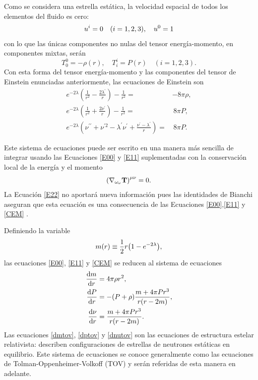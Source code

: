 Como se considera una estrella estática, la velocidad espacial de todos los elementos del fluido es cero:
\begin{equation}
    u^{i}=0 \quad (i=1,2,3)\qc u ^ { 0 } = 1
\end{equation}
con lo que las únicas componentes no nulas del tensor energía-momento, en componentes mixtas, serán
\begin{equation}
T _ { 0 } ^ { 0 } = -\rho(r) , \quad T _ { i } ^ { i } =  P(r) \quad ( i=1,2,3 ).  
\end{equation}
Con esta forma del tensor energía-momento y las componentes del tensor de Einstein enunciadas anteriormente, las ecuaciones de Einstein son
\begin{align}
     e ^ { - 2 \lambda } \left( \frac { 1 } { r ^ { 2 } } - \frac { 2 \lambda ^ { \prime } } { r } \right) - \frac { 1 } { r ^ { 2 } } =&  -8\pi\rho, \label{E00} \\
    e ^ { - 2 \lambda } \left( \frac { 1 } { r ^ { 2 } } + \frac { 2 \nu ^ { \prime } } { r } \right) - \frac { 1 } { r ^ { 2 } } =& \, 8\pi P, \label{E11}\\
    e ^ { - 2 \lambda } \left( \nu ^ { \prime \prime } + \nu ^ { \prime 2 } - \lambda ^ { \prime } \nu ^ { \prime } + \frac { \nu ^ { \prime } - \lambda ^ { \prime } } { r } \right) =& \, 8\pi P. \label{E22}
\end{align}

Este sistema de ecuaciones puede ser escrito en una manera más sencilla de integrar usando las Ecuaciones \eqref{E00} y \eqref{E11} suplementadas con la conservación local de la energía y el momento
\begin{equation}
    \qty(\nabla_{\omega_\nu}\mathbf{T})^{\mu \nu} = 0 \label{CEM}.
\end{equation}
La Ecuación \ref{E22} no aportará nueva información pues las identidades de Bianchi aseguran que esta ecuación es una consecuencia de las Ecuaciones \eqref{E00},\eqref{E11} y \eqref{CEM} \cite{Schutz2009}.

Definiendo la variable 
\begin{equation}
     m(r) \equiv \frac{1}{2}r\qty(1-e^{-2\lambda}), \label{misnermass}
\end{equation}
las ecuaciones \eqref{E00}, \eqref{E11} y \eqref{CEM} se reducen al sistema de ecuaciones 
\begin{subequations}
\begin{align}
    \dv{m}{r} &= 4\pi \rho r^2, \label{dmtov} \\
     \dv{P}{r} &= -(P+\rho)\frac{m+4\pi P  r^3}{r\qty(r-2m)},\label{dptov} \\
    \dv{\nu}{r} &= \frac{m+4\pi P   r^3}{r\qty(r-2m)}.\label{dnutov}
\end{align}
\end{subequations}
Las ecuaciones \eqref{dmtov}, \eqref{dptov} y \eqref{dnutov} son las ecuaciones de estructura estelar relativista: describen configuraciones de estrellas de neutrones estáticas en equilibrio. Este sistema de ecuaciones se conoce generalmente como las ecuaciones de Tolman-Oppenheimer-Volkoff (TOV)  \cite{Tolman1939,Oppenheimer1939} y serán referidas de esta manera en adelante. 

